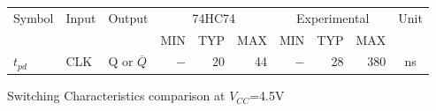 \begin{tabular}{|l|l|l|r|r|r|r|r|r|c|}
    \toprule
    Symbol  &Input  &Output &\multicolumn{3}{c|}{74HC74}&\multicolumn{3}{c|}{Experimental}&Unit\\
            &       &       &       MIN&TYP&MAX          &          MIN&TYP&MAX             &    \\
    \midrule
    $t_{pd}$&CLK&Q or $\overline{Q}$&$-$&20&44&$-$&28&380&ns\\  %
    \bottomrule
\end{tabular}
\caption{Switching Characteristics comparison at $V_{CC}$=4.5V}